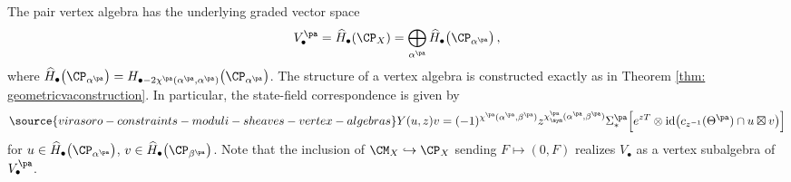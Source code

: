 The pair vertex algebra has the underlying graded vector space
$$
V^{\pa}_\bullet =\widehat {H}_\bullet(\CP_{X})= \bigoplus_{\alpha^{\pa}}\widehat{H}_{\bullet}\big(\CP_{\alpha^{\pa}}\big)\,,
$$
where $\widehat{H}_\bullet\big(\CP_{\alpha^{\pa}}\big) = H_{\bullet-2\chi^{\pa}(\alpha^{\pa}, \alpha^{\pa})}\big(\CP_{\alpha^{\pa}}\big)$. The structure of a vertex algebra is constructed exactly as in Theorem \ref{thm: geometricvaconstruction}. In particular, the state-field correspondence is given by
    \begin{equation}\label{eq: joycefieldspa}
\source{virasoro-constraints-moduli-sheaves-vertex-algebras}
    Y(u,z)v = (-1)^{\chi^{\pa}(\alpha^{\pa}, \beta^{\pa})}z^{\chi_\sym^{\pa}(\alpha^{\pa},\beta^{\pa})}\Sigma^{\pa}_\ast\Big[e^{zT}\otimes \text{id}\big(c_{z^{-1}}(\Theta^{\pa})\cap u\boxtimes v\big)\Big]
    \end{equation}
for $u\in \widehat{H}_\bullet\big(\CP_{\alpha^{\pa}}\big)$, $v\in \widehat{H}_\bullet\big(\CP_{\beta^{\pa}}\big)$.
Note that the inclusion of $\CM_X\hookrightarrow \CP_X$ sending $F\mapsto (0, F)$ realizes $V_\bullet$ as a vertex subalgebra of $V_\bullet^{\pa}$.


